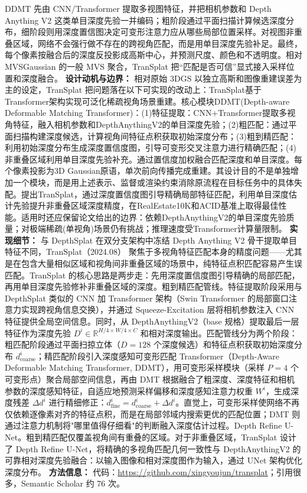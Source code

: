 DDMT 先由 CNN/Transformer 提取多视图特征，并把相机参数和 Depth Anything V2 这类单目深度先验一并编码；粗阶段通过平面扫描计算候选深度分布，细阶段则用深度置信图决定可变形注意力应从哪些局部位置采样。对视图非重叠区域，网络不会强行做不存在的跨视角匹配，而是用单目深度先验补足。最终，每个像素按融合后的深度反投影成高斯中心，并预测尺度、颜色和不透明度。相对 MVSGaussian 的一般 MVS 聚合，TranSplat 把“匹配是否可信”显式接入采样位置和深度融合。
\textbf{设计动机与边界：} 相对原始 3DGS 以独立高斯和图像重建误差为主的设定，TranSplat 把问题落在以下可实现的改动上：TranSplat基于Transformer架构实现可泛化稀疏视角场景重建。核心模块DDMT(Depth-aware Deformable Matching Transformer)：(1)特征提取：CNN+Transformer提取多视角特征，融入相机参数和DepthAnythingV2的单目深度先验；(2)粗匹配：通过平面扫描构建深度候选，计算视角间特征点积获取初始深度分布；(3)粗到精匹配：利用初始深度分布生成深度置信度图，引导可变形交叉注意力进行精确匹配；(4)非重叠区域利用单目深度先验补充。通过置信度加权融合匹配深度和单目深度。每个像素投影为3D Gaussian原语，单次前向传播完成重建。其设计目的不是单独增加一个模块，而是用上述表示、监督或渲染约束消除原流程在目标任务中的具体失配。提出TranSplat，通过深度置信度图引导精确局部特征匹配，利用单目深度估计先验提升非重叠区域深度精度，在RealEstate10K和ACID基准上取得最佳性能。适用时还应保留论文给出的边界：依赖DepthAnythingV2的单目深度先验质量；对极端稀疏(单视角)场景仍有挑战；推理速度受Transformer计算量限制。
\textbf{实现细节：} 与 DepthSplat 在双分支架构中冻结 Depth Anything V2 骨干提取单目特征不同，TranSplat（2024.08） 聚焦于多视角特征匹配本身的精度问题——尤其是在包含大量相似区域和视角间非重叠区域的场景中，纯特征点积匹配容易产生误匹配。TranSplat 的核心思路是两步走：先用深度置信度图引导精确的局部匹配，再用单目深度先验修补非重叠区域的深度。粗到精匹配管线。特征提取阶段采用与 DepthSplat 类似的 CNN 加 Transformer 架构（Swin Transformer 的局部窗口注意力实现跨视角信息交换），并通过 Squeeze-Excitation 层将相机参数注入 CNN 特征提供全局空间信息。同时，从 DepthAnythingV2（base 规格）提取最后一层特征作为深度先验 $D^i \in \mathbb{R}^{H/4 \times W/4 \times C}$ 和相对深度输出。匹配管线分为两个阶段：粗匹配阶段通过平面扫掠立体（$D{=}128$ 个深度候选）和特征点积获取初始深度分布 $d^i_{\mathrm{coarse}}$；精匹配阶段引入深度感知可变形匹配 Transformer（Depth-Aware Deformable Matching Transformer, DDMT），用可变形采样模块（采样 $P{=}4$ 个可变形点）聚合局部空间信息，再由 DMT 根据融合了粗深度、深度特征和相机参数的深度感知特征，自适应地预测采样偏移和深度感知注意力权重 $W^i$，生成深度残差 $\Delta d^i$ 进行精细修正：$d^i_{\mathrm{fine}} = d^i_{\mathrm{coarse}} + \Delta d^i$。直觉上，可变形采样使网络不再仅依赖逐像素对齐的特征点积，而是在局部邻域内搜索更优的匹配位置；DMT 则通过注意力机制将"哪里值得仔细看"的判断融入深度估计过程。Depth Refine U-Net。粗到精匹配仅覆盖视角间有重叠的区域。对于非重叠区域，TranSplat 设计了 Depth Refine U-Net，将精确的多视角匹配几何一致性与 DepthAnythingV2 的可靠相对深度先验融合：以输入图像和相对深度图作为输入，通过 UNet 架构优化深度分布。
\textbf{方法信息：} 代码：\url{https://github.com/xingyoujun/transplat}；引用很多，Semantic Scholar 约 76 次。



